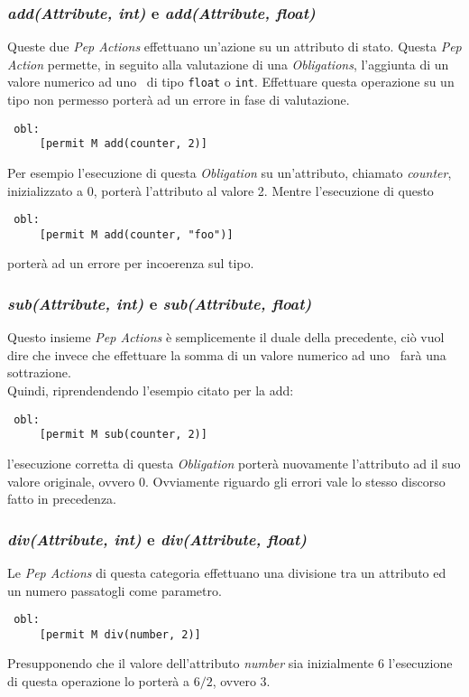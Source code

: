 \subsubsection*{\textit{add(Attribute, int)} e \textit{add(Attribute, float)}} %
\label{ssub:opadd}
Queste due \textit{Pep Actions} effettuano un'azione su un attributo di stato. Questa \textit{Pep Action} permette, in seguito alla valutazione di una \textit{Obligations}, l'aggiunta di un valore numerico ad uno \statusattribute \ di tipo \texttt{float} o \texttt{int}. Effettuare questa operazione su un tipo non permesso porterà ad un errore in fase di valutazione.
\begin{verbatim}
 obl:
     [permit M add(counter, 2)]
\end{verbatim}
Per esempio l'esecuzione di questa \textit{Obligation} su un'attributo, chiamato \textit{counter}, inizializzato a 0, porterà l'attributo al valore 2.
Mentre l'esecuzione di questo
\begin{verbatim}
 obl:
     [permit M add(counter, "foo")]
\end{verbatim}
porterà ad un errore per incoerenza sul tipo.
\subsubsection*{\textit{sub(Attribute, int)} e \textit{sub(Attribute, float)}} %
\label{ssub:opsub}
Questo insieme \textit{Pep Actions} è semplicemente il duale della precedente, ciò vuol dire che invece che effettuare la somma di un valore numerico ad uno \statusattribute \ farà una sottrazione.\\
Quindi, riprendendendo l'esempio citato per la add:
\begin{verbatim}
 obl:
     [permit M sub(counter, 2)]
\end{verbatim}
l'esecuzione corretta di questa \textit{Obligation} porterà nuovamente l'attributo ad il suo valore originale, ovvero 0. Ovviamente riguardo gli errori vale lo stesso discorso fatto in precedenza.

\subsubsection*{\textit{div(Attribute, int)} e \textit{div(Attribute, float)}} %
\label{ssub:opdiv}
Le \textit{Pep Actions} di questa categoria effettuano una divisione tra un attributo ed un numero passatogli come parametro.
\begin{verbatim}
 obl:
     [permit M div(number, 2)]
\end{verbatim}
Presupponendo che il valore dell'attributo \textit{number} sia inizialmente 6 l'esecuzione di questa operazione lo porterà a $6/2$, ovvero 3.

